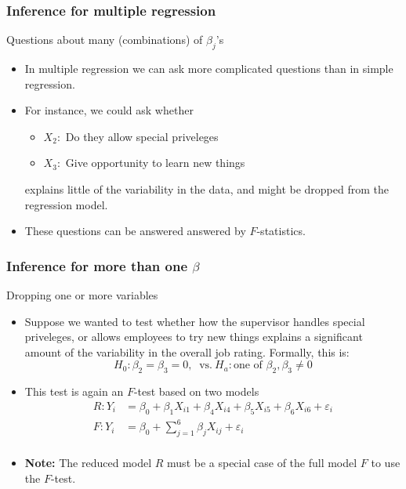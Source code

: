 \documentclass[handout]{beamer}
\begin{document}
   \begin{frame} \frametitle{Inference for multiple regression}

   \begin{block}
   {Questions about many (combinations) of $\beta_j$'s}
   \begin{itemize}

   \item In multiple regression we can ask more complicated questions
   than in simple regression.


   \item For instance, we could ask whether
   \begin{itemize}

   \item $X_2:$ Do they allow  special priveleges

   \item $X_3:$ Give opportunity to learn new things
   \end{itemize}
   explains little of the variability in the data, and might be dropped
   from the regression model.
   \item These questions can be answered answered by $F$-statistics.
   \end{itemize}
   \end{block}
   \end{frame}


   \begin{frame} \frametitle{Inference for more than one $\beta$}

   \begin{block}
   {Dropping one or more variables}
   \begin{itemize}

   \item       Suppose we wanted to test whether how the supervisor
   handles special priveleges, or allows employees to try new things
   explains a significant amount of the variability in the overall job rating. Formally, this is:
   $$
   H_0:\beta_{2}=\beta_3=0, \  \text{ vs.} \  H_a: \text{one of $\beta_2, \beta_3 \neq 0$}$$

   \item This test is again an $F$-test based on two models
   $$
   \begin{aligned}
   R: Y_i &= \beta_0 + \beta_1 X_{i1} + \beta_4 X_{i4} + \beta_5 X_{i5} + \beta_6 X_{i6} + \varepsilon_i \\
   F: Y_i &= \beta_0 + \sum_{j=1}^6 \beta_j X_{ij} + \varepsilon_i \\
   \end{aligned}
   $$

   \item {\bf Note:} The reduced model $R$ must be a special case of the full model $F$ to use the $F$-test.
   \end{itemize}
   \end{block}
   \end{frame}
\end{document}
